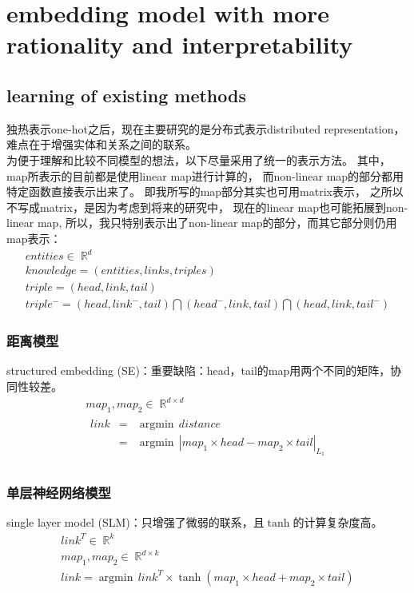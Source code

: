 \documentclass[12pt]{ctexart}
\DeclareMathOperator\argmin{argmin}
\DeclareMathOperator\R{\mathbb{R}}
\theoremstyle{definition}
\begin{document}
\section{embedding model with more rationality and interpretability}
\subsection{learning of existing methods}
独热表示one-hot之后，现在主要研究的是分布式表示distributed representation，
难点在于增强实体和关系之间的联系。\\
为便于理解和比较不同模型的想法，以下尽量采用了统一的表示方法。
其中，map所表示的目前都是使用linear map进行计算的，
而non-linear map的部分都用特定函数直接表示出来了。
即我所写的map部分其实也可用matrix表示，
之所以不写成matrix，是因为考虑到将来的研究中，
现在的linear map也可能拓展到non-linear map,
所以，我只特别表示出了non-linear map的部分，而其它部分则仍用map表示：
\[\begin{array}{l}
    entities\in \R^d\\
    knowledge=(entities,links,triples)\\
    triple=(head,link,tail)\\
    triple^-=(head,link^-,tail) \bigcap (head^-,link, tail) \bigcap (head, link, tail^-)
\end{array}\]

\subsubsection{距离模型}
structured embedding (SE)：重要缺陷：head，tail的map用两个不同的矩阵，协同性较差。
\[\begin{array}{l}
    map_1, map_2\in \R^{d\times d}\\
    \begin{array}{lll}
        link&=&{\argmin}\,distance\\
        &=&{\argmin}\,|map_1\times head - map_2\times tail|_{L_1}\\
    \end{array}
\end{array}\]

\subsubsection{单层神经网络模型}
single layer model (SLM)：只增强了微弱的联系，且$\tanh$的计算复杂度高。
\[\begin{array}{l}
    link^T\in \R^k\\
    map_1, map_2\in \R^{d\times k}\\
    link={\argmin}\,link^T \times \tanh(map_1\times head+map_2 \times tail)
\end{array}\]
\end{document}
